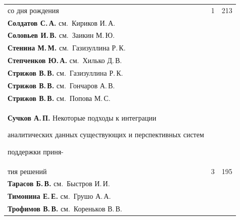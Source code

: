 {\begin{tabular}{p{317.5pt}rr}
\hspace*{21pt}со дня рождения&1&213\\


\textbf{Солдатов С.\,А.} см.\ Кириков И.\,А.&&\\


\textbf{Соловьев И.\,В.} см.\ Заикин М.\,Ю.&&\\


\textbf{Стенина М.\,М.} см.\ Газизуллина Р.\,К.&&\\


\textbf{Степченков Ю.\,А.} см.\ Хилько Д.\,В.&&\\


\textbf{Стрижов В.\,В.} см.\ Газизуллина Р.\,К.&&\\


\textbf{Стрижов В.\,В.} см.\ Гончаров А.\,В.&&\\


\textbf{Стрижов В.\,В.} см.\ Попова М.\,С.&&\\


\hangindent=21pt\noindent\textbf{Сучков А.\,П.} Некоторые подходы к интеграции


аналитических данных существующих и перспективных систем


поддержки приня-\linebreak


\\[-12pt]


\hspace*{21pt}тия решений&3&195\\


\textbf{Тарасов Б.\,В.} см.\ Быстров И.\,И.&&\\


\textbf{Тимонина Е.\,Е.} см.\ Грушо А.\,А.&&\\


\textbf{Трофимов В.\,В.} см.\ Кореньков В.\,В.&&\\


\end{tabular}


}


\pagebreak





\def\rightkol{АВТОРСКИЙ УКАЗАТЕЛЬ ЗА 2015 г.}


\def\leftkol{АВТОРСКИЙ УКАЗАТЕЛЬ ЗА 2015 г.}





\noindent


